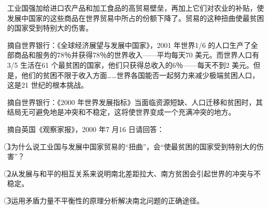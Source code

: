 \documentclass[UTF8,11pt]{ctexart}
\begin{document}
工业国强加给进口农产品和加工食品的高贸易壁垒，再加上它们对农业的补贴，使发展中国家的这些商品在世界贸易中所占的份额下降了。贸易的这种扭曲使最贫困的国家受到特别大的伤害。

摘自世界银行：《全球经济展望与发展中国家》，2001 年世界1/6 的人口生产了全部商品和服务的78％并获得78％的世界收入——平均每天70 美元。而世界人口有3/5 生活在61 个最贫困的国家，他们只获得总收入的6％——每天不到2 美元。但是，他们的贫困不限于收入方面……世界各国能否一起努力来减少极端贫困人口，这是21 世纪的根本挑战。

摘自世界银行：《2000 年世界发展指标》当面临资源短缺、人口迁移和贫困时，其结局无可避免地是冲突和不稳定，这将使世界变成一个充满冲突的地方。

摘自英国《观察家报》，2000 年7 月16 日请回答：

\textcircled{1}为什么说工业国与发展中国家贸易的“扭曲”，会“使最贫困的国家受到特别大的伤害”？


\textcircled{2}从发展与和平的相互关系来说明南北差距拉大、南方贫困会引起世界的冲突与不稳定。


\textcircled{3}运用矛盾力量不平衡性的原理分析解决南北问题的正确途径。
\end{document}
